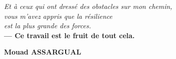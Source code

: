 \begin{flushright}
\vspace{0.45cm}

\begin{tcolorbox}[
  colback  = PrimaryBlue!8,
  colframe = PrimaryBlue,
  arc      = 4pt,
  width    = 0.85\textwidth
]
\begin{center}
{\normalsize\textit{Et à ceux qui ont dressé des obstacles sur mon chemin,}}\\[0.2cm]
{\normalsize\textit{vous m'avez appris que la résilience}}\\
{\normalsize\textit{est la plus grande des forces.}}\\[0.3cm]
{\small\textcolor{PrimaryBlue}{\textbf{— Ce travail est le fruit de tout cela.}}}
\end{center}
\end{tcolorbox}

\vspace{0.7cm}

{\large\textbf{Mouad ASSARGUAL}}

\end{flushright}